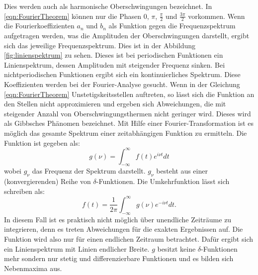 Dies werden auch als harmonische Oberschwingungen bezeichnet. In \ref{eqn:FourierTheorem} können nur die Phasen $0$, $\pi$, $\frac{\pi}{2}$ und $\frac{3\pi}{2}$ vorkommen.
Wenn die Fourierkoeffizienten $a_{n}$ und $b_{n}$ als Funktion gegen die Frequenzspektrum aufgetragen werden, was die Amplituden der Oberschwingungen darstellt, ergibt sich das jeweilige Frequenzspektrum. Dies ist in der Abbildung \ref{fig:linienspektrum} zu sehen. Dieses ist bei periodischen Funktionen ein Linienspektrum, dessen Amplituden mit steigender Frequenz sinken. Bei nichtperiodischen Funktionen ergibt sich ein kontinuierliches Spektrum. Diese Koeffizienten werden bei der Fourier-Analyse gesucht.
Wenn in der Gleichung \ref{eqn:FourierTheorem} Unstetigskeitsstellen auftreten, so lässt sich die Funktion an den Stellen nicht approximieren und ergeben sich Abweichungen, die mit steigender Anzahl von Oberschwingungsthermen nicht geringer wird. Dieses wird als Gibbsches Phänomen bezeichnet. 
Mit Hilfe einer Fourier-Transformation ist es möglich das gesamte Spektrum einer zeitabhängigen Funktion zu ermitteln. Die Funktion ist gegeben als:
\begin{equation}
g(\nu) = \int_{-\infty}^{\infty} f(t) e^{i \nu t} dt
\end{equation}
wobei $g_{\nu}$ das Frequenz der Spektrum darstellt. $g_{\nu}$ besteht aus einer (konvergierenden) Reihe von $\delta$-Funktionen. Die Umkehrfunktion lässt sich schreiben als:
\begin{equation*}
f(t) = \frac{1}{2 \pi} \int_{-\infty}^{\infty} g(\nu) e^{-i \nu t}dt.
\end{equation*} 
In diesem Fall ist es praktisch nicht möglich über unendliche Zeiträume zu integrieren, denn es treten Abweichungen für die exakten Ergebnissen auf. Die Funktion wird also nur für einen endlichen Zeitraum betrachtet. Dafür ergibt sich ein Linienspektrum mit Linien endlicher Breite. $g$ besitzt keine $\delta$-Funktionen mehr sondern nur stetig und differenzierbare Funktionen und es bilden sich Nebenmaxima aus.
